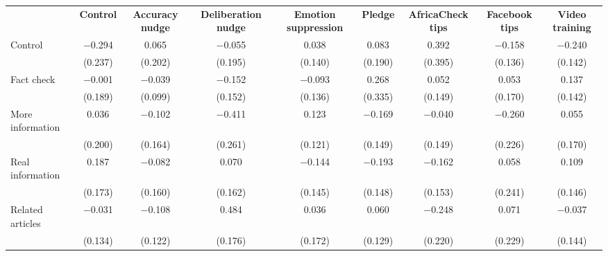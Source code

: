 
\begin{tabular}[t]{lcccccccc}
 & \textbf{Control} & \textbf{Accuracy nudge} & \textbf{Deliberation nudge} & \textbf{Emotion suppression} & \textbf{Pledge} & \textbf{AfricaCheck tips} & \textbf{Facebook tips} & \textbf{Video training}\\ 
 \cmidrule(lr){2-2} \cmidrule(lr){3-3}\cmidrule(lr){4-4}\cmidrule(lr){5-5}\cmidrule(lr){6-6}\cmidrule(lr){7-7}\cmidrule(lr){8-8}\cmidrule(lr){9-9}
Control & \num{-0.294} & \num{0.065} & \num{-0.055} & \num{0.038} & \num{0.083} & \num{0.392} & \num{-0.158} & \num{-0.240}\\
 & (\num{0.237}) & (\num{0.202}) & (\num{0.195}) & (\num{0.140}) & (\num{0.190}) & (\num{0.395}) & (\num{0.136}) & (\num{0.142})\\
Fact check & \num{-0.001} & \num{-0.039} & \num{-0.152} & \num{-0.093} & \num{0.268} & \num{0.052} & \num{0.053} & \num{0.137}\\
 & (\num{0.189}) & (\num{0.099}) & (\num{0.152}) & (\num{0.136}) & (\num{0.335}) & (\num{0.149}) & (\num{0.170}) & (\num{0.142})\\
More information & \num{0.036} & \num{-0.102} & \num{-0.411} & \num{0.123} & \num{-0.169} & \num{-0.040} & \num{-0.260} & \num{0.055}\\
 & (\num{0.200}) & (\num{0.164}) & (\num{0.261}) & (\num{0.121}) & (\num{0.149}) & (\num{0.149}) & (\num{0.226}) & (\num{0.170})\\
Real information & \num{0.187} & \num{-0.082} & \num{0.070} & \num{-0.144} & \num{-0.193} & \num{-0.162} & \num{0.058} & \num{0.109}\\
 & (\num{0.173}) & (\num{0.160}) & (\num{0.162}) & (\num{0.145}) & (\num{0.148}) & (\num{0.153}) & (\num{0.241}) & (\num{0.146})\\
Related articles & \num{-0.031} & \num{-0.108} & \num{0.484} & \num{0.036} & \num{0.060} & \num{-0.248} & \num{0.071} & \num{-0.037}\\
 & (\num{0.134}) & (\num{0.122}) & (\num{0.176}) & (\num{0.172}) & (\num{0.129}) & (\num{0.220}) & (\num{0.229}) & (\num{0.144})\\
\bottomrule
\end{tabular}
